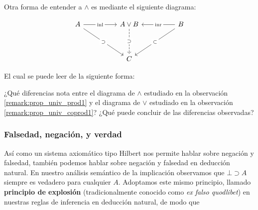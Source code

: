 \documentclass{article}
\DeclareMathOperator{\inr }{inr }
\DeclareMathOperator{\inl}{inl}
\begin{document}
\begin{remark}\label{remark:prop_univ_coprod1}
    Otra forma de entender a $\wedge$ es mediante el siguiente diagrama:

    \[\begin{tikzcd}
        A && {A \lor B} && B \\
        \\
        && C
        \arrow["\subset"{description}, from=1-5, to=3-3]
        \arrow["\supset"{description}, from=1-1, to=3-3]
        \arrow["\inl"{description}, from=1-1, to=1-3]
        \arrow["\inr "{description}, from=1-5, to=1-3]
        \arrow["\supset"{description}, dashed, from=1-3, to=3-3]
    \end{tikzcd}\]

    El cual se puede leer de la siguiente forma:

    \begin{center}
    \end{center}
    
\end{remark}

\begin{exercise}
    ¿Qué diferencias nota entre el diagrama de $\wedge$ estudiado en la observación 
    \ref{remark:prop_univ_prod1} y el diagrama de $\vee$ estudiado en la observación
    \ref{remark:prop_univ_coprod1}? ¿Qué puede concluir de las diferencias
    observadas?
\end{exercise}

\subsubsection{Falsedad, negación, y verdad}

Así como un sistema axiomático tipo Hilbert nos permite hablar sobre negación y falsedad, también podemos hablar sobre negación y falsedad en deducción natural.
En nuestro análisis semántico de la implicación observamos que $\bot \supset A$ siempre es vedadero para cualquier $A$. Adoptamos este mismo principio, llamado \textbf{principio de explosión} (tradicionalmente conocido como \textit{ex falso quodlibet}) en nuestras reglas de inferencia en deducción natural, de modo que
\end{document}
